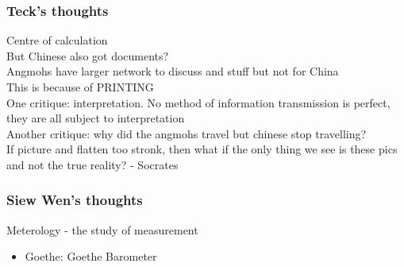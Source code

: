 \documentclass[a4paper]{article}
\begin{document}
\subsubsection{Teck's thoughts}
Centre of calculation\\
But Chinese also got documents?\\
Angmohs have larger network to discuss and stuff but not for China\\
This is because of PRINTING\\
One critique: interpretation. No method of information transmission is perfect, they are all subject to interpretation\\
Another critique: why did the angmohs travel but chinese stop travelling?\\
If picture and flatten too stronk, then what if the only thing we see is these pics and not the true reality? - Socrates
\subsubsection{Siew Wen's thoughts}
Meterology - the study of measurement
\begin{itemize}
	\item Goethe: Goethe Barometer
\end{itemize}
\end{document}
